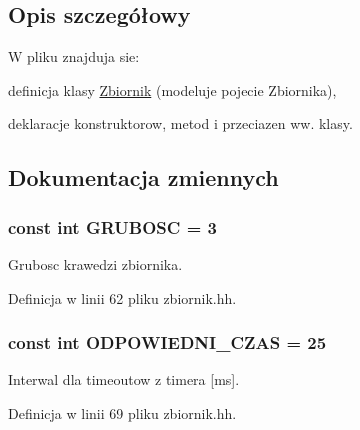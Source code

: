 \subsection{Opis szczegółowy}
W pliku znajduja sie\+:
\begin{DoxyItemize}
\item definicja klasy \hyperlink{class_zbiornik}{Zbiornik} (modeluje pojecie Zbiornika),
\item deklaracje konstruktorow, metod i przeciazen ww. klasy. 
\end{DoxyItemize}

\subsection{Dokumentacja zmiennych}
\hypertarget{zbiornik_8hh_a359a95636f17b8e9b7a01389d75b521d}{}
\subsubsection[{G\+R\+U\+B\+O\+S\+C}]{\setlength{\rightskip}{0pt plus 5cm}const int G\+R\+U\+B\+O\+S\+C = 3}\label{zbiornik_8hh_a359a95636f17b8e9b7a01389d75b521d}
Grubosc krawedzi zbiornika. 

Definicja w linii 62 pliku zbiornik.\+hh.

\hypertarget{zbiornik_8hh_a3a09b0fc9bed85242f7783147af182ae}{}
\subsubsection[{O\+D\+P\+O\+W\+I\+E\+D\+N\+I\+\_\+\+C\+Z\+A\+S}]{\setlength{\rightskip}{0pt plus 5cm}const int O\+D\+P\+O\+W\+I\+E\+D\+N\+I\+\_\+\+C\+Z\+A\+S = 25}\label{zbiornik_8hh_a3a09b0fc9bed85242f7783147af182ae}
Interwal dla timeout\textquotesingle{}ow z timera \mbox{[}ms\mbox{]}. 

Definicja w linii 69 pliku zbiornik.\+hh.

\hypertarget{zbiornik_8hh_acd3c5814c051e565bf7854f6403acf49}{}
